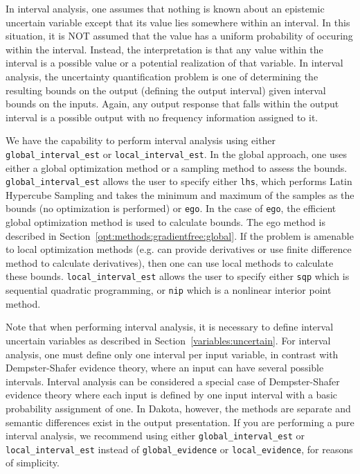 In interval analysis, one assumes that nothing is known about 
an epistemic uncertain variable except that its value lies 
somewhere within an interval. In this situation, it is NOT 
assumed that the value has a uniform probability of occuring 
within the interval. Instead, the interpretation is that 
any value within the interval is a possible value or a potential 
realization of that variable. In interval analysis, the 
uncertainty quantification problem is one of determining the 
resulting bounds on the output (defining the output interval) 
given interval bounds on the inputs. Again, any output response 
that falls within the output interval is a possible output 
with no frequency information assigned to it.

We have the capability to perform interval analysis using either
\texttt{global\_interval\_est} or \texttt{local\_interval\_est}.  In
the global approach, one uses either a global optimization method or a
sampling method to assess the bounds.  \texttt{global\_interval\_est}
allows the user to specify either \texttt{lhs}, which performs Latin
Hypercube Sampling and takes the minimum and maximum of the samples as
the bounds (no optimization is performed) or \texttt{ego}. In the case
of \texttt{ego}, the efficient global optimization method is used to
calculate bounds. The ego method is described in
Section~\ref{opt:methods:gradientfree:global}.  If the problem is
amenable to local optimization methods (e.g. can provide derivatives
or use finite difference method to calculate derivatives), then one
can use local methods to calculate these
bounds. \texttt{local\_interval\_est} allows the user to specify
either \texttt{sqp} which is sequential quadratic programming, or
\texttt{nip} which is a nonlinear interior point method.

Note that when performing interval analysis, it is necessary to define
interval uncertain variables as described in
Section~\ref{variables:uncertain}. For interval analysis, one must
define only one interval per input variable, in contrast with
Dempster-Shafer evidence theory, where an input can have several
possible intervals. Interval analysis can be considered a special
case of Dempster-Shafer evidence theory where each input is defined by
one input interval with a basic probability assignment of one. In
Dakota, however, the methods are separate and semantic differences
exist in the output presentation. If you are performing a pure
interval analysis, we recommend using either
\texttt{global\_interval\_est} or \texttt{local\_interval\_est}
instead of \texttt{global\_evidence} or \texttt{local\_evidence}, for
reasons of simplicity. %

